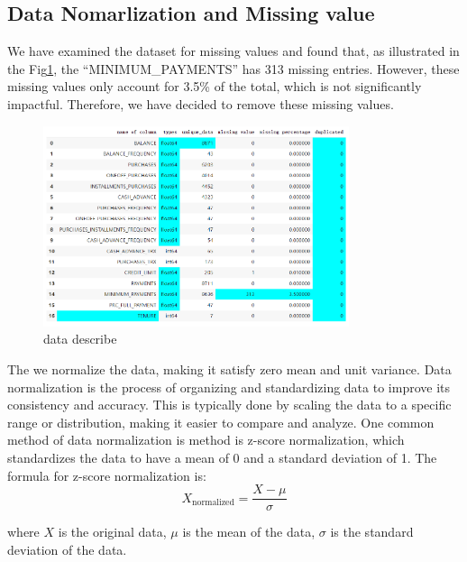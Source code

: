 \documentclass{article}
\begin{document}
\subsection{Data Nomarlization and Missing value}
We have examined the dataset for missing values and found that, as illustrated in the Fig\ref{fig:missing}, the ``MINIMUM\_PAYMENTS'' has 313 missing entries. However, these missing values only account for 3.5\% of the total, which is not significantly impactful. Therefore, we have decided to remove these missing values.
\begin{figure}[hbt!]
    \centering
    \includegraphics[width=0.8\textwidth]{fig/zya/missing value.png}
    \caption{data describe}
    \label{fig:missing}  %
\end{figure}
The we normalize the data, making it satisfy zero mean and unit variance. Data normalization is the process of organizing and standardizing data to improve its consistency and accuracy. This is typically done by scaling the data to a specific range or distribution, making it easier to compare and analyze.
One common method of data normalization is method is z-score normalization, which standardizes the data to have a mean of 0 and a standard deviation of 1. The formula for z-score normalization is:
\begin{equation}
    X_{\text{normalized}} = \frac{X - \mu}{\sigma} 
\end{equation}

where $X$ is the original data, $\mu$ is the mean of the data, $\sigma$ is the standard deviation of the data.
\end{document}
